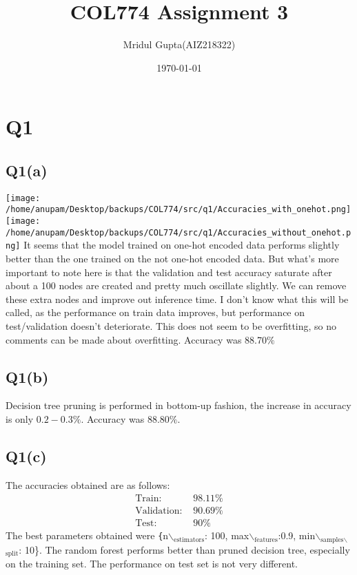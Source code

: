 \documentclass[11pt]{article}
\author{Mridul Gupta(AIZ218322)}
\date{\today}
\title{COL774 Assignment 3}
\begin{document}
\maketitle
\section{Q1}
\label{sec-1}
\subsection{Q1(a)}
\label{sec-1-1}
\texttt{[image: /home/anupam/Desktop/backups/COL774/src/q1/Accuracies\_with\_onehot.png]}
\texttt{[image: /home/anupam/Desktop/backups/COL774/src/q1/Accuracies\_without\_onehot.png]}
It seems that the model trained on one-hot encoded data performs
slightly better than the one trained on the not one-hot encoded
data. But what's more important to note here is that the validation
and test accuracy saturate after about a 100 nodes are created and
pretty much oscillate slightly. We can remove these extra nodes and
improve out inference time. I don't know what this will be called, as
the performance on train data improves, but performance on
test/validation doesn't deteriorate. This does not seem to be
overfitting, so no comments can be made about overfitting. Accuracy
was 88.70\(\%\)

\subsection{Q1(b)}
\label{sec-1-2}
Decision tree pruning is performed in bottom-up fashion, the increase
in accuracy is only \(0.2-0.3\%\). Accuracy was \(88.80\%\).
\subsection{Q1(c)}
\label{sec-1-3}
The accuracies obtained are as follows:
\begin{align*}
\text{Train: }&98.11\%\\
\text{Validation: }&90.69\%\\
\text{Test: }&90\%
\end{align*}
The best parameters obtained were \texttt\{n$\backslash$$_{\text{estimators}}$: 100,
max$\backslash$$_{\text{features}}$:0.9, min$\backslash$$_{\text{samples$\backslash$}}$$_{\text{split}}$: 10\}. The random forest
performs better than pruned decision tree, especially on the training
set. The performance on test set is not very different.
\end{document}
